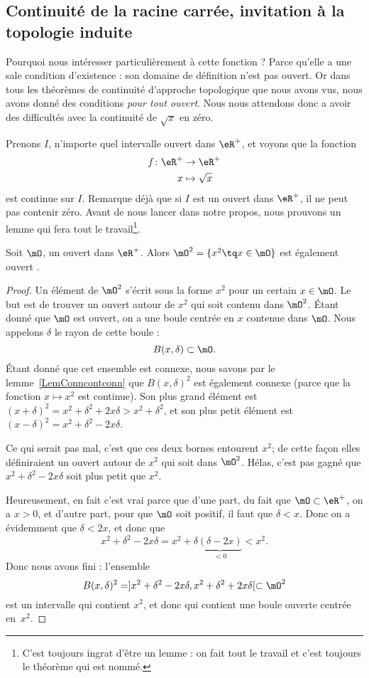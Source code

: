 \subsection{Continuité de la racine carrée, invitation à la topologie induite}

Pourquoi nous intéresser particulièrement à cette fonction ? Parce qu'elle a une sale condition d'existence : son domaine de définition n'est pas ouvert. Or dans tous les théorèmes de continuité d'approche topologique que nous avons vus, nous avons donné des conditions \emph{pour tout ouvert}. Nous nous attendons donc a avoir des difficultés avec la continuité de $\sqrt{x}$ en zéro.

Prenons $I$, n'importe quel intervalle ouvert dans $\eR^+$, et voyons que la fonction
\begin{equation}
\begin{aligned}
 f\colon \eR^+&\to \eR^+ \\
   x&\mapsto \sqrt{x}
\end{aligned}
\end{equation}
est continue sur $I$. Remarque déjà que si $I$ est un ouvert dans $\eR^+$, il ne peut pas contenir zéro. Avant de nous lancer dans notre propos, nous prouvons un lemme qui fera tout le travail\footnote{C'est toujours ingrat d'être un lemme : on fait tout le travail et c'est toujours le théorème qui est nommé.}.

\begin{lemma}
Soit $\mO$, un ouvert dans $\eR^+$. Alors $\mO^2=\{ x^2\tq x\in\mO \}$ est également ouvert .
\end{lemma}

\begin{proof}
Un élément de $\mO^2$ s'écrit sous la forme $x^2$ pour un certain $x\in\mO$. Le but est de trouver un ouvert autour de $x^2$ qui soit contenu dans $\mO^2$. Étant donné que $\mO$ est ouvert, on a une boule centrée en $x$ contenue dans $\mO$. Nous appelons $\delta$ le rayon de cette boule :
\[
  B(x,\delta)\subset\mO.
\]
Étant donné que cet ensemble est connexe, nous savons par le lemme~\ref{LemConncontconn} que $B(x,\delta)^2$ est également connexe (parce que la fonction $x\mapsto x^2$ est continue). Son plus grand élément est $(x+\delta)^2=x^2+\delta^2+2x\delta>x^2+\delta^2$, et son plus petit élément est $(x-\delta)^2=x^2+\delta^2-2x\delta$.

Ce qui serait pas mal, c'est que ces deux bornes entourent $x^2$; de cette façon elles définiraient un ouvert autour de $x^2$ qui soit dans $\mO^2$. Hélas, c'est pas gagné que $x^2+\delta^2-2x\delta$ soit plus petit que $x^2$.

Heureusement, en fait c'est vrai parce que d'une part, du fait que $\mO\subset\eR^+$, on a $x>0$, et d'autre part, pour que $\mO$ soit positif, il faut que $\delta<x$. Donc on a évidemment que $\delta<2x$, et donc que
\[
  x^2+\delta^2-2x\delta=x^2+\delta\underbrace{(\delta-2x)}_{<0}<x^2.
\]
Donc nous avons fini : l'ensemble
\[
  B(x,\delta)^2=]x^2+\delta^2-2x\delta,x^2+\delta^2+2x\delta[\subset\mO^2
\]
est un intervalle qui contient $x^2$, et donc qui contient une boule ouverte centrée en~$x^2$.

\end{proof}

